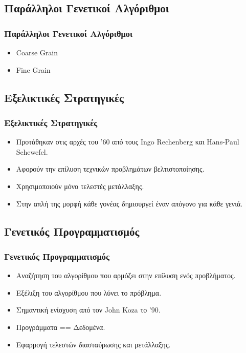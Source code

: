 \documentclass[xetex,mathserif,serif,14pt]{beamer}
\begin{document}
\subsection{Παράλληλοι Γενετικοί Αλγόριθμοι}

\begin{frame}
\frametitle{Παράλληλοι Γενετικοί Αλγόριθμοι}
\begin{itemize}
  \item Coarse Grain
  \item Fine Grain
\end{itemize}
\end{frame}

\subsection{Εξελικτικές Στρατηγικές}

\begin{frame}
\frametitle{Εξελικτικές Στρατηγικές}
\begin{itemize}
  \item Προτάθηκαν στις αρχές του '60 από τους Ingo Rechenberg και Hans-Paul Schewefel.
  \item Αφορούν την επίλυση τεχνικών προβλημάτων βελτιστοποίησης.
  \item Χρησιμοποιούν μόνο τελεστές μετάλλαξης.
  \item Στην απλή της μορφή κάθε γονέας δημιουργεί έναν απόγονο για κάθε γενιά.
\end{itemize}
\end{frame}

\subsection{Γενετικός Προγραμματισμός}

\begin{frame}
\frametitle{Γενετικός Προγραμματισμός}
\begin{itemize}
  \item Αναζήτηση του αλγορίθμου που αρμόζει στην επίλυση ενός προβλήματος.
  \item Εξέλιξη του αλγορίθμου που λύνει το πρόβλημα.
  \item Σημαντική ενίσχυση από τον John Koza το '90.
  \item Προγράμματα == Δεδομένα.
  \item Εφαρμογή τελεστών διασταύρωσης και μετάλλαξης.
\end{itemize}
\end{frame}
\end{document}
